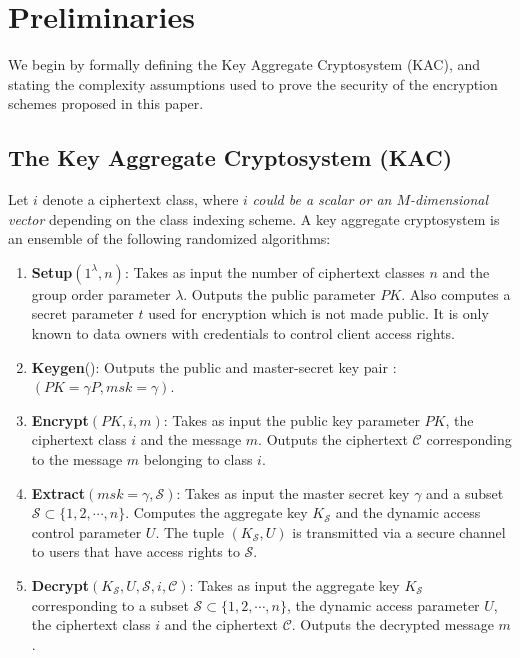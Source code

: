 \section{Preliminaries}
\label{sec:prelims}

We begin by formally defining the Key Aggregate Cryptosystem (KAC), and stating the complexity assumptions used to prove the security of the encryption schemes proposed in this paper.

\subsection{The Key Aggregate Cryptosystem (KAC)}
\label{subsec:KAC}

Let $i$ denote a ciphertext class, where $i$ \emph{could be a scalar or an $M$-dimensional vector} depending on the class indexing scheme. A key aggregate cryptosystem is an ensemble of the following randomized algorithms:

\begin{enumerate}
 \item \textbf{Setup}$(1^{\lambda},n)$: Takes as input the number of ciphertext classes $n$ and the group order parameter $\lambda$. Outputs the public parameter $PK$. Also computes a secret parameter $t$ used for encryption which is not made public. It is only known to data owners with credentials to control client access rights.  
 
 \item \textbf{Keygen}(): Outputs the public and master-secret key pair : $(PK={\gamma}P,msk=\gamma)$.
 
 \item \textbf{Encrypt}$(PK,i,m)$: Takes as input the public key parameter $PK$, the ciphertext class $i$ and the message $m$. Outputs the ciphertext $\mathcal{C}$ corresponding to the message $m$ belonging to class $i$. 
 
 \item \textbf{Extract}$(msk=\gamma,\mathcal{S})$: Takes as input the master secret key $\gamma$ and a subset $\mathcal{S} \subset\{1,2,\cdots,n\}$. Computes the aggregate key $K_{\mathcal{S}}$ and the dynamic access control parameter $U$. The tuple $(K_{\mathcal{S}},U)$ is transmitted via a secure channel to users that have access rights to $\mathcal{S}$.
 
 \item \textbf{Decrypt}$(K_{\mathcal{S}}, U, \mathcal{S},i,\mathcal{C})$: Takes as input the aggregate key $K_{\mathcal{S}}$ corresponding to a subset $\mathcal{S} \subset\{1,2,\cdots,n\}$, the dynamic access parameter $U$, the ciphertext class $i$ and the ciphertext $\mathcal{C}$. Outputs the decrypted message $m$.
\end{enumerate}

